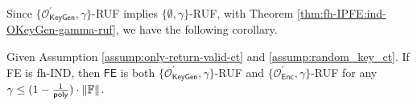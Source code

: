 Since $\{ \mathcal{O}^\prime_{\textsf{KeyGen}}, \gamma \}$-RUF implies $\{ \emptyset, \gamma \}$-RUF, with Theorem \ref{thm:fh-IPFE:ind-OKeyGen-gamma-ruf}, we have the following corollary.

\begin{corollary}
\label{cor:fh-IPFE:ind-OKeyGen-OEnc-ruf}
Given Assumption \ref{assump:only-return-valid-ct} and \ref{assump:random_key_ct}. If \textsf{FE} is fh-IND, then $\textsf{FE}$ is both $\{ \mathcal{O}^\prime_{\textsf{KeyGen}}, \gamma \}$-RUF and $\{ \mathcal{O}^\prime_{\textsf{Enc}}, \gamma \}$-RUF for any $\gamma \leq (1 - \frac{1}{\mathsf{poly}}) \cdot \|\mathbb{F}\|$.
\end{corollary}



% 

\pagebreak

\nocite{*}
\printbibliography




